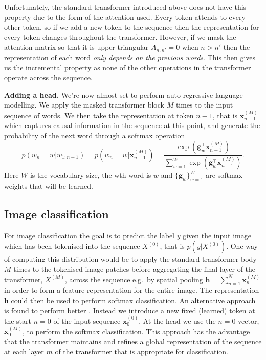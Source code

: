 \documentclass{article}
\begin{document}
Unfortunately, the standard transformer introduced above does not have this property due to the form of the attention used. Every token attends to every other token,  so if we add a new token to the sequence then the representation for every token changes throughout the transformer. However, if we mask the attention matrix so that it is upper-triangular $A_{n,n'} = 0$ when $n>n'$ then the representation of each word \emph{only depends on the previous words}. This then gives us the incremental property as none of the other operations in the transformer operate across the sequence.

\textbf{Adding a head.} We're now almost set to perform auto-regressive language modelling. We apply the masked transformer block $M$ times to the input sequence of words. We then take the representation at token $n-1$, that is $\bm{x}^{(M)}_{n-1}$ which captures causal information in the sequence at this point, and 
generate the probability of the next word through a softmax operation  
%
\[ p(w_n = w | w_{1:n-1}) = p(w_n = w | \bm{x}^{(M)}_{n-1}) = \frac{ \exp(\bm{g}_w^\top \bm{x}_{n-1}^{(M)}) } {\sum_{w=1}^W\exp(\bm{g}_w^\top \bm{x}_{n-1}^{(M)})}.\]
%
Here $W$ is the vocabulary size, the wth word is $w$ and $\{ \bm{g}_w \}_{w=1}^W$ are softmax weights that will be learned.



\subsection{Image classification}

For image classification the goal is to predict the label $y$ given the input image which has been tokenised into the sequence $X^{(0)}$, that is $p(y | X^{(0)} )$. One way of computing this distribution  would be to apply the standard transformer body $M$ times to the tokenised image patches before aggregating the final layer of the transformer, $X^{(M)}$, across the sequence e.g.~by spatial pooling $\bm{h} = \sum_{n=1}^N \bm{x}_n^{(M)}$ in order to form a feature representation for the entire image. The representation $\bm{h}$ could then be used to perform softmax classification. An alternative approach is found to perform better \citep{vision-transformer}. Instead we introduce a new fixed (learned) token at the start $n=0$ of the input sequence $\bm{x}_0^{(0)}$. At the head we use the $n=0$ vector, $\bm{x}_0^{(M)}$, to perform the softmax classification. This approach has the advantage that the transformer maintains and refines a global representation of the sequence at each layer $m$ of the transformer that is appropriate for classification.  
\end{document}
